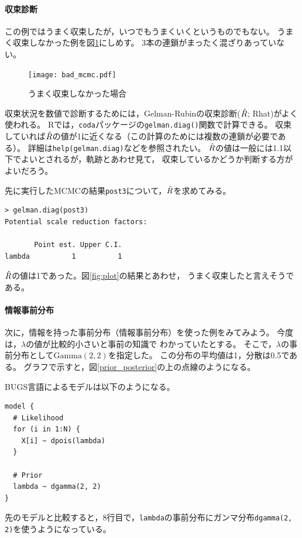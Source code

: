 \documentclass[11pt,uplatex]{jsarticle}
\begin{document}
\paragraph{収束診断}
この例ではうまく収束したが，いつでもうまくいくというものでもない。
うまく収束しなかった例を図\ref{bad_mcmc}にしめす。
3本の連鎖がまったく混ざりあっていない。
\begin{figure}[htbp]
	\begin{center}
		\texttt{[image: bad\_mcmc.pdf]}
	\end{center}
	\caption{うまく収束しなかった場合}
	\label{bad_mcmc}
\end{figure}

収束状況を数値で診断するためには，Gelman-Rubinの収束診断($\Hat{R}$; Rhat)がよく使われる。
\textsf{R}では，\texttt{coda}パッケージの\texttt{gelman.diag()}関数で計算できる。
収束していれば$\Hat{R}$の値が1に近くなる（この計算のためには複数の連鎖が必要である）。
詳細は\texttt{help(gelman.diag)}などを参照されたい。
$\Hat{R}$の値は一般には1.1以下でよいとされるが，軌跡とあわせ見て，
収束しているかどうか判断する方がよいだろう。

先に実行したMCMCの結果\texttt{post3}について，$\Hat{R}$を求めてみる。
\begin{lstlisting}
> gelman.diag(post3)
Potential scale reduction factors:

       Point est. Upper C.I.
lambda          1          1

\end{lstlisting}
$\Hat{R}$の値は1であった。図\ref{fig:plot}の結果とあわせ，
うまく収束したと言えそうである。

\paragraph{情報事前分布}

次に，情報を持った事前分布（情報事前分布）を使った例をみてみよう。
今度は，$\lambda$の値が比較的小さいと事前の知識で
わかっていたとする。
そこで，$\lambda$の事前分布として$\mathrm{Gamma}(2, 2)$を指定した。
この分布の平均値は1，分散は0.5である。
グラフで示すと，図\ref{prior_posterior}の上の点線のようになる。

\textsf{BUGS}言語によるモデルは以下のようになる。
\begin{lstlisting}
model {
  # Likelihood
  for (i in 1:N) {
    X[i] ~ dpois(lambda)
  }

  # Prior
  lambda ~ dgamma(2, 2)
}
\end{lstlisting}
先のモデルと比較すると，8行目で，\texttt{lambda}の事前分布にガンマ分布\texttt{dgamma(2, 2)}を使うようになっている。
\end{document}

